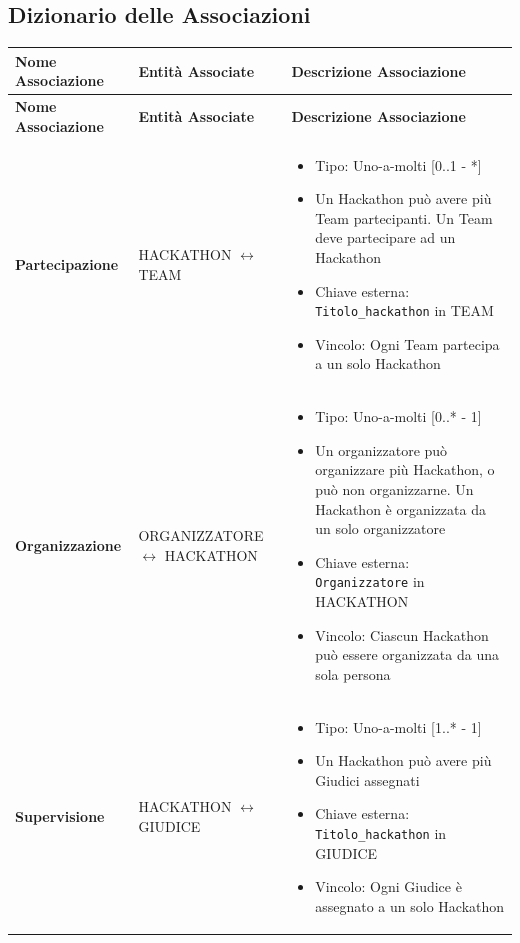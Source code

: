 \documentclass[a4paper, 10pt]{article}
\renewcommand{\arraystretch}{1.2} %
\begin{document}
	\subsection{Dizionario delle Associazioni}
	{\footnotesize
		\setlength{\arrayrulewidth}{0.5pt}
		\renewcommand{\arraystretch}{1.5}
		\begin{longtable}{
				>{\raggedright\arraybackslash}p{4cm} %
				>{\centering\arraybackslash}p{4cm}    %
				>{\raggedright\arraybackslash}p{6.5cm}%
			}
			\hline
			\textbf{Nome Associazione} & \textbf{Entità Associate} & \textbf{Descrizione Associazione} \\
			\hline
			\endfirsthead
			\hline
			\textbf{Nome Associazione} & \textbf{Entità Associate} & \textbf{Descrizione Associazione} \\
			\hline
			\endhead
			\hline
			\endfoot
			\hline
			\endlastfoot
			
			\textbf{Partecipazione}  & 
			HACKATHON $\leftrightarrow$ TEAM &
			\begin{itemize}
				\item Tipo: Uno-a-molti [0..1 - *]
				\item Un Hackathon può avere più Team partecipanti. Un Team deve partecipare ad un Hackathon
				\item Chiave esterna: \texttt{Titolo\_hackathon} in TEAM
				\item Vincolo: Ogni Team partecipa a un solo Hackathon
			\end{itemize} \\
			\hline
			
			\textbf{Organizzazione} & 
			ORGANIZZATORE $\leftrightarrow$ HACKATHON &
			\begin{itemize}
				\item Tipo: Uno-a-molti [0..* - 1]
				\item Un organizzatore può organizzare più Hackathon, o può non organizzarne. Un Hackathon è organizzata da un solo organizzatore
				\item Chiave esterna: \texttt{Organizzatore} in HACKATHON
				\item Vincolo: Ciascun Hackathon può essere organizzata da una sola persona
			\end{itemize} \\
			\hline
			
			\textbf{Supervisione} & 
			HACKATHON $\leftrightarrow$ GIUDICE &
			\begin{itemize}
				\item Tipo: Uno-a-molti [1..* - 1]
				\item Un Hackathon può avere più Giudici assegnati
				\item Chiave esterna: \texttt{Titolo\_hackathon} in GIUDICE
				\item Vincolo: Ogni Giudice è assegnato a un solo Hackathon
			\end{itemize} \\
			\hline
			

\end{longtable}}
\end{document}
